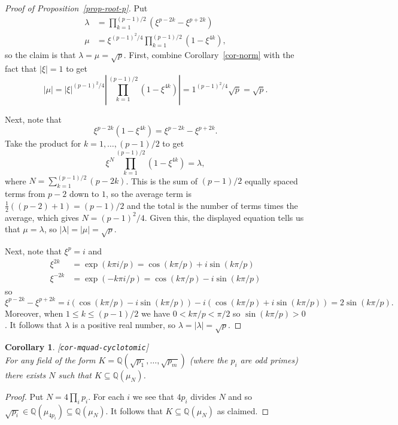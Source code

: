 \documentclass{amsart}
\newcommand{\lbl}[1]{\label{#1}\textup{[\texttt{#1}]}\ \\}
\newcommand{\lbl}{\label}
\newcommand{\Q}         {{\mathbb{Q}}}
\newcommand{\lm}        {\lambda}
\newcommand{\sse}       {\subseteq}
\newcommand{\half}      {{\textstyle\frac{1}{2}}}
\renewcommand{\:}{\colon}
\newtheorem{corollary}[theorem]{Corollary}
\theoremstyle{definition}
\begin{document}
\begin{proof}[Proof of Proposition~\ref{prop-root-p}]
 Put 
 \begin{align*}
  \lm &= \prod_{k=1}^{(p-1)/2} (\xi^{p-2k}-\xi^{p+2k}) \\ 
  \mu &= \xi^{(p-1)^2/4} \prod_{k=1}^{(p-1)/2} (1-\xi^{4k}),
 \end{align*}
 so the claim is that $\lm=\mu=\sqrt{p}$.  First, combine
 Corollary~\ref{cor-norm} with the fact that $|\xi|=1$ to get
 \[ |\mu| = |\xi|^{(p-1)^2/4}
      \left|\prod_{k=1}^{(p-1)/2}(1-\xi^{4k})\right| = 
       1^{(p-1)^2/4} \sqrt{p} = \sqrt{p}. 
 \]

 Next, note that
 \[ \xi^{p-2k}(1-\xi^{4k}) = \xi^{p-2k} - \xi^{p+2k}. \]
 Take the product for $k=1,\dotsc,(p-1)/2$ to get 
 \[ \xi^N \prod_{k=1}^{(p-1)/2} (1-\xi^{4k}) = \lm, \]
 where $N=\sum_{k=1}^{(p-1)/2}(p-2k)$.  This is the sum of $(p-1)/2$
 equally spaced terms from $p-2$ down to $1$, so the average term is
 $\half((p-2)+1)=(p-1)/2$ and the total is the number of terms times
 the average, which gives $N=(p-1)^2/4$.  Given this, the displayed
 equation tells us that $\mu=\lm$, so $|\lm|=|\mu|=\sqrt{p}$.

 Next, note that $\xi^p=i$ and 
 \begin{align*}
  \xi^{2k}  &= \exp( k\pi i/p) = \cos(k\pi/p) + i\sin(k\pi/p) \\
  \xi^{-2k} &= \exp(-k\pi i/p) = \cos(k\pi/p) - i\sin(k\pi/p)
 \end{align*}
 so 
 \[ \xi^{p-2k}-\xi^{p+2k} =
     i(\cos(k\pi/p) - i\sin(k\pi/p)) -
     i(\cos(k\pi/p) + i\sin(k\pi/p)) = 2\sin(k\pi/p).
 \]
 Moreover, when $1\leq k\leq (p-1)/2$ we have $0<k\pi/p<\pi/2$ so
 $\sin(k\pi/p)>0$.  It follows that $\lm$ is a positive real number,
 so $\lm=|\lm|=\sqrt{p}$.
\end{proof}

\begin{corollary}\lbl{cor-mquad-cyclotomic}
 For any field of the form $K=\Q(\sqrt{p_1},\dotsc,\sqrt{p_m})$ (where
 the $p_i$ are odd primes) there exists $N$ such that $K\sse\Q(\mu_N)$.
\end{corollary}
\begin{proof}
 Put $N=4\prod_ip_i$.  For each $i$ we see that $4p_i$ divides $N$ and
 so $\sqrt{p_i}\in\Q(\mu_{4p_i})\sse\Q(\mu_N)$.  It follows that
 $K\sse\Q(\mu_N)$ as claimed.
\end{proof}

\end{document}
